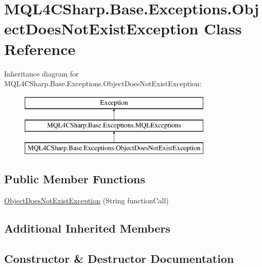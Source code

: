 \hypertarget{class_m_q_l4_c_sharp_1_1_base_1_1_exceptions_1_1_object_does_not_exist_exception}{}\section{M\+Q\+L4\+C\+Sharp.\+Base.\+Exceptions.\+Object\+Does\+Not\+Exist\+Exception Class Reference}
\label{class_m_q_l4_c_sharp_1_1_base_1_1_exceptions_1_1_object_does_not_exist_exception}
Inheritance diagram for M\+Q\+L4\+C\+Sharp.\+Base.\+Exceptions.\+Object\+Does\+Not\+Exist\+Exception\+:\begin{figure}[H]
\begin{center}
\leavevmode
\includegraphics[height=3.000000cm]{class_m_q_l4_c_sharp_1_1_base_1_1_exceptions_1_1_object_does_not_exist_exception}
\end{center}
\end{figure}
\subsection*{Public Member Functions}
\begin{DoxyCompactItemize}
\item 
\hyperlink{class_m_q_l4_c_sharp_1_1_base_1_1_exceptions_1_1_object_does_not_exist_exception_ae2e99730636c392d4c99e067322d1689}{Object\+Does\+Not\+Exist\+Exception} (String function\+Call)
\end{DoxyCompactItemize}
\subsection*{Additional Inherited Members}


\subsection{Constructor \& Destructor Documentation}
